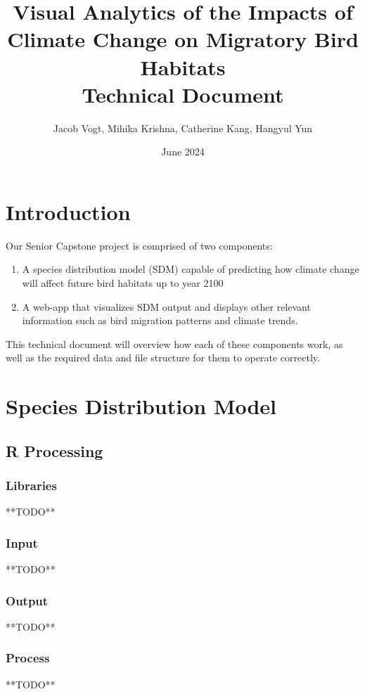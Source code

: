 \documentclass{article}
\title{Visual Analytics of the Impacts of Climate Change on 
Migratory Bird Habitats \\
 \Large{Technical Document}}
\author{Jacob Vogt, Mihika Krishna, Catherine Kang, Hangyul Yun}
\date{June 2024}
\begin{document}
\maketitle

\tableofcontents

\newpage

\section{Introduction}
Our Senior Capstone project is comprised of two components:

\begin{enumerate}
  \item A species distribution model (SDM) capable of predicting how climate change will affect future bird habitats up to year 2100
  \item A web-app that visualizes SDM output and displays other relevant information such as bird migration patterns and climate trends.
\end{enumerate}

This technical document will overview how each of these components work, as well as the required data and file structure for them to operate correctly.

\newpage

\section{Species Distribution Model}

\subsection{R Processing}

\subsubsection*{Libraries}
**TODO**

\subsubsection*{Input}
**TODO**

\subsubsection*{Output}
**TODO**

\subsubsection*{Process}
**TODO**
\end{document}
